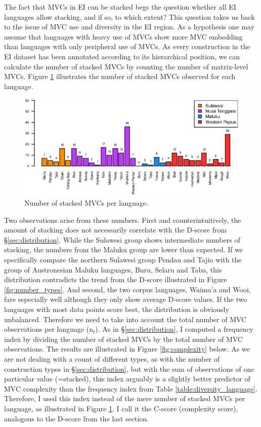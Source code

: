 The fact that MVCs in EI can be stacked begs the question whether all EI languages allow stacking, and if so, to which extent? This question takes us back to the issue of MVC use and diversity in the EI region. As a hypothesis one may assume that languages with heavy use of MVCs show more MVC embedding than languages with only peripheral use of MVCs. As every construction in the EI dataset has been annotated according to its hierarchical position, we can calculate the number of stacked MVCs by counting the number of matrix-level MVCs. Figure \ref{fig:stacked} illustrates the number of stacked MVCs observed for each language.

\begin{figure}
\includegraphics[width=\textwidth]{figures/number_stackedMVC_clean.eps}
\caption[Number of stacked MVCs per language]{Number of stacked MVCs per language.}\label{fig:stacked}
\end{figure}

Two observations arise from these numbers. First and counterintuitively, the amount of stacking does not necessarily correlate with the D-score from §\ref{sec:distribution}. While the Sulawesi group shows intermediate numbers of stacking, the numbers from the Maluku group are lower than expected. If we specifically compare the northern Sulawesi group Pendau and Tajio with the group of Austronesian Maluku languages, Buru, Selaru and Taba, this distribution contradicts the trend from the D-score illustrated in Figure \ref{fig:number_types}. And second, the two corpus languages, Waima'a and Wooi, fare especially well although they only show average D-score values. If the two languages with most data points score best, the distribution is obviously unbalanced. Therefore we need to take into account the total number of MVC observations per language (n$_t$). As in §\ref{sec:distribution}, I computed a frequency index by dividing the number of stacked MVCs by the total number of MVC observations. The results are illustrated in Figure \ref{fig:complexity} below. As we are not dealing with a count of different types, as with the number of construction types in §\ref{sec:distribution}, but with the sum of observations of one particular value (=stacked), this index arguably is a slightly better predictor of MVC complexity than the frequency index from Table \ref{table:diversity_language}. Therefore, I used this index instead of the mere number of stacked MVCs per language, as illustrated in Figure \ref{fig:stacked}. I call it the C-score (complexity score), analogous to the D-score from the last section.


